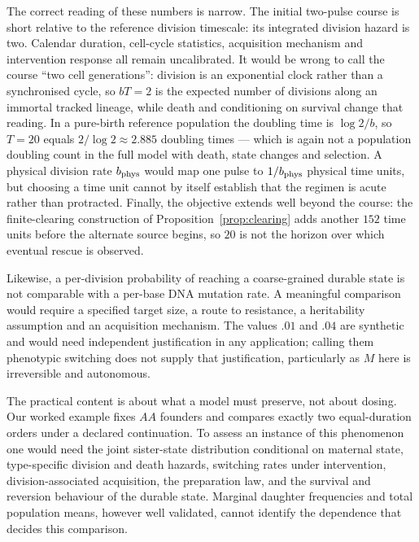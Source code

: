 \documentclass[11pt]{article}
\theoremstyle{remark}
\begin{document}
The correct reading of these numbers is narrow. The initial two-pulse course is
short relative to the reference division timescale: its integrated division
hazard is two. Calendar duration, cell-cycle statistics, acquisition mechanism
and intervention response all remain uncalibrated. It would be wrong to call the
course ``two cell generations'': division is an exponential clock rather than a
synchronised cycle, so $bT=2$ is the expected number of divisions along an
immortal tracked lineage, while death and conditioning on survival change that
reading. In a pure-birth reference population the doubling time is $\log2/b$, so
$T=20$ equals $2/\log2\approx2.885$ doubling times --- which is again not a
population doubling count in the full model with death, state changes and
selection. A physical division rate $b_{\rm phys}$ would map one pulse to
$1/b_{\rm phys}$ physical time units, but choosing a time unit cannot by itself
establish that the regimen is acute rather than protracted. Finally, the
objective extends well beyond the course: the finite-clearing construction of
Proposition~\ref{prop:clearing} adds another $152$ time units before the
alternate source begins, so $20$ is not the horizon over which eventual rescue is
observed.

Likewise, a per-division probability of reaching a coarse-grained durable state
is not comparable with a per-base DNA mutation rate. A meaningful comparison
would require a specified target size, a route to resistance, a heritability
assumption and an acquisition mechanism. The values $.01$ and $.04$ are synthetic
and would need independent justification in any application; calling them
phenotypic switching does not supply that justification, particularly as $M$ here
is irreversible and autonomous.

The practical content is about what a model must preserve, not about dosing. Our
worked example fixes $AA$ founders and compares exactly two equal-duration orders
under a declared continuation. To assess an instance of this phenomenon one would
need the joint sister-state distribution conditional on maternal state,
type-specific division and death hazards, switching rates under intervention,
division-associated acquisition, the preparation law, and the survival and
reversion behaviour of the durable state. Marginal daughter frequencies and total
population means, however well validated, cannot identify the dependence that
decides this comparison.
\end{document}
